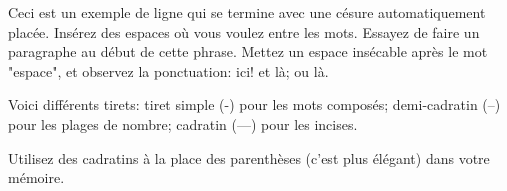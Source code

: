 Ceci est un exemple de ligne qui se termine avec une césure automatiquement placée.
Insérez des espaces où vous voulez entre les mots. 
Essayez de faire un paragraphe au début de cette phrase. Mettez un espace insécable après le mot "espace", et observez la ponctuation: ici! et là; ou là.

Voici différents tirets: tiret simple (-) pour les mots composés; demi-cadratin (--) pour les plages de nombre; cadratin (---) pour les incises.



Utilisez des cadratins à la place des parenthèses (c'est plus élégant) dans votre mémoire.


